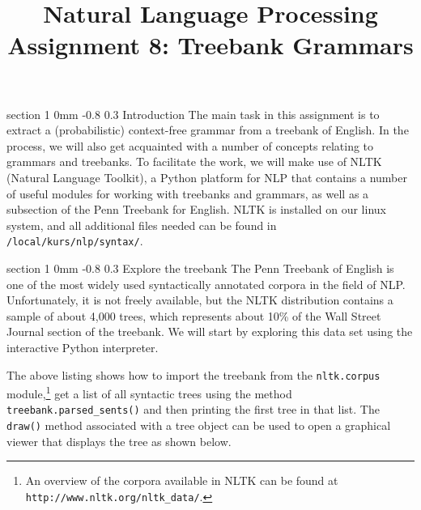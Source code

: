 \documentclass[11pt]{article}
\title{{\LARGE Natural Language Processing}\\[1.5mm]{\large Assignment 8: Treebank Grammars}}
\author{}
\date{} %
\makeatletter
\newcommand{\newsec}[2]{\section{#1}\label{sec:#2}\noindent}
\renewcommand{\section}{\@startsection
{section}%
{1}%
{0mm}%
{-0.8\baselineskip}%
{0.3\baselineskip}%
{\bfseries\large}}%
\makeatother
\begin{document}
 

\maketitle
\vspace{-2mm}
\newsec{Introduction}{intro}%
The main task in this assignment is to extract a (probabilistic) context-free grammar from a treebank of English. In the process, we will also get acquainted with a number of 
concepts relating to grammars and treebanks. To facilitate the work, we will make use of NLTK (Natural Language Toolkit), a Python platform for NLP that
contains a number of useful modules for working with treebanks and grammars, as well as a subsection of the Penn Treebank for English. NLTK is installed
on our linux system, and all additional files needed can be found in {\tt /local/kurs/nlp/syntax/}.

\newsec{Explore the treebank}{data}%
The Penn Treebank of English is one of the most widely used syntactically annotated corpora in the field of NLP. Unfortunately, it is not freely available, but the NLTK distribution
contains a sample of about 4,000 trees, which represents about 10\% of the Wall Street Journal section of the treebank. We will start by exploring this data set using the interactive
Python interpreter.

\begin{center}
\fbox{

}
\end{center}
The above listing shows how to import the treebank from the {\tt nltk.corpus} 
module,\footnote{An overview of the corpora available in NLTK can be found at {\tt http://www.nltk.org/nltk\_data/}.} 
get a list of all syntactic trees using the method {\tt treebank.parsed\_sents()}
and then printing the first tree in that list. The {\tt draw()} method associated with 
a tree object can be used to open a graphical viewer that displays the tree as shown below.
\end{document}
